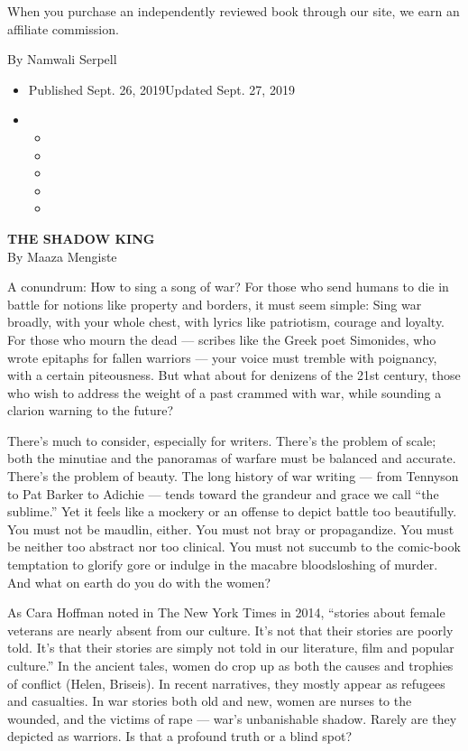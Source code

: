 When you purchase an independently reviewed book through our site, we
earn an affiliate commission.

By Namwali Serpell

\begin{itemize}
\item
  Published Sept. 26, 2019Updated Sept. 27, 2019
\item
  \begin{itemize}
  \item
  \item
  \item
  \item
  \item
  \end{itemize}
\end{itemize}

\textbf{THE SHADOW KING}\\
By Maaza Mengiste

A conundrum: How to sing a song of war? For those who send humans to die
in battle for notions like property and borders, it must seem simple:
Sing war broadly, with your whole chest, with lyrics like patriotism,
courage and loyalty. For those who mourn the dead --- scribes like the
Greek poet Simonides, who wrote epitaphs for fallen warriors --- your
voice must tremble with poignancy, with a certain piteousness. But what
about for denizens of the 21st century, those who wish to address the
weight of a past crammed with war, while sounding a clarion warning to
the future?

There's much to consider, especially for writers. There's the problem of
scale; both the minutiae and the panoramas of warfare must be balanced
and accurate. There's the problem of beauty. The long history of war
writing --- from Tennyson to Pat Barker to Adichie --- tends toward the
grandeur and grace we call ``the sublime.'' Yet it feels like a mockery
or an offense to depict battle too beautifully. You must not be maudlin,
either. You must not bray or propagandize. You must be neither too
abstract nor too clinical. You must not succumb to the comic-book
temptation to glorify gore or indulge in the macabre bloodsloshing of
murder. And what on earth do you do with the women?

As Cara Hoffman noted in The New York Times in 2014, ``stories about
female veterans are nearly absent from our culture. It's not that their
stories are poorly told. It's that their stories are simply not told in
our literature, film and popular culture.'' In the ancient tales, women
do crop up as both the causes and trophies of conflict (Helen, Briseis).
In recent narratives, they mostly appear as refugees and casualties. In
war stories both old and new, women are nurses to the wounded, and the
victims of rape --- war's unbanishable shadow. Rarely are they depicted
as warriors. Is that a profound truth or a blind spot?

